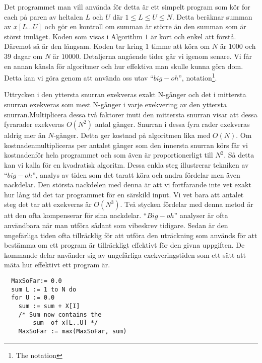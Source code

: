 \documentclass[a4paper,12pt]{article}
\begin{document}
Det programmet man vill använda för detta är ett simpelt program som kör for
each på paren av heltalen $L$ och $U$ där $1 \leq L \leq U \leq N$. Detta
beräknar summan
av $x[L...U]$ och gör en kontroll om summan är större än den summan som är
störst
inuläget. Koden som visas i Algorithm $1$ är kort och enkel att förstå. Däremot
så
är den långsam. Koden tar kring $1$ timme att köra om $N$ är $1000$ och $39$
dagar om $N$
  är $10000$. Detaljerna angående tider går vi igenom senare.
%
\newline
\newline
%
 Vi får en annan känsla för algoritmer och hur effektiva man skulle kunna göra
dom. Detta kan vi göra genom att använda oss utav $“big-oh”$,
notation\footnote{The notation}.

Uttrycken i den yttersta snurran exekveras exakt N-gånger och det i mittersta
snurran exekveras som mest N-gånger i varje exekvering av den yttersta
snurran.Multiplicera dessa två faktorer inuti den mittersta snurran visar att
dessa fyrarader exekveras $O(N^2)$ antal gånger. Snurran i dessa fyra rader
exekveras aldrig mer än $N$-gånger. Detta ger kostnad på algoritmen lika med
 $O(N)$. Om kostnadenmultipliceras per antalet gånger som den innersta snurran
körs får vi kostnadenför hela programmet och som även är proportionerligt till 
$N^2$. Så detta kan vi kalla för en kvadratisk algoritm.
%
\newline
\newline
%
Dessa enkla steg illustrerar tekniken av $“big-oh”$, analys av tiden som det
taratt köra och andra fördelar men även nackdelar. Den största nackdelen med
denna är att vi fortfarande inte vet exakt hur lång tid det tar programmet för
en
särskild input. Vi vet bara att antalet steg det tar att exekveras är $O(N^3)$.
Två stycken fördelar med denna metod är att den ofta kompenserar för sina
nackdelar. $“Big-oh”$ analyser är ofta användbara när man utföra sådant som
vibeskrev tidigare. Sedan är den ungefärliga tiden ofta tillräcklig för att
utföra den uträckning som används för att bestämma om ett program är
tillräckligt effektivt för den givna uppgiften.
%
\newline
%
De kommande delar använder sig av ungefärliga exekveringstiden som ett sätt att
mäta hur effektivt ett program är.
\newpage
\begin{center}
%
\begin{lstlisting}
  MaxSoFar:= 0.0
  sum L := 1 to N do
  for U := 0.0
  	sum := sum + X[I]
	/* Sum now contains the
		sum  of x[L..U] */
  	MaxSoFar := max(MaxSoFar, sum)
\end{lstlisting}
%
\end{center}
\end{document}
